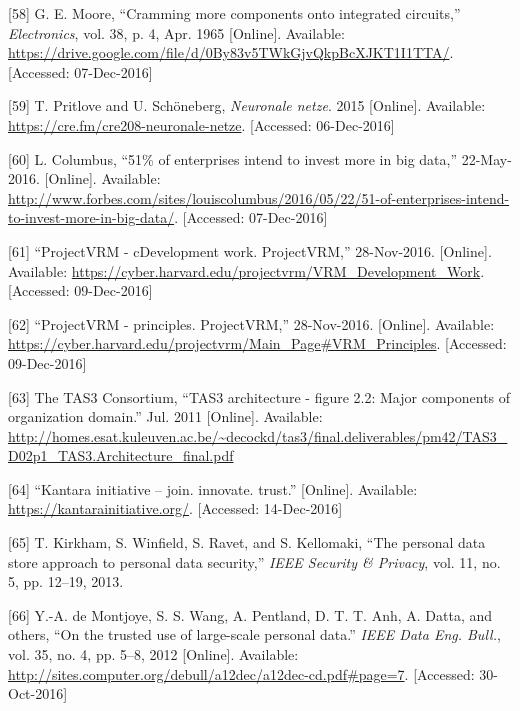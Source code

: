 \documentclass[12pt,english,a4paper,titlepage,cleardoublepage=empty,dottedtoc]{report}
\begin{document}
\hypertarget{ref-paper_1965_moors-law}{}
{[}58{]} G. E. Moore, ``Cramming more components onto integrated
circuits,'' \emph{Electronics}, vol. 38, p. 4, Apr. 1965 {[}Online{]}.
Available:
\url{https://drive.google.com/file/d/0By83v5TWkGjvQkpBcXJKT1I1TTA/}.
{[}Accessed: 07-Dec-2016{]}

\hypertarget{ref-podcast_2015_cre-neuronale-netze}{}
{[}59{]} T. Pritlove and U. Schöneberg, \emph{Neuronale netze}. 2015
{[}Online{]}. Available: \url{https://cre.fm/cre208-neuronale-netze}.
{[}Accessed: 06-Dec-2016{]}

\hypertarget{ref-web_2016_industries-intention-to-invest-in-big-data}{}
{[}60{]} L. Columbus, ``51\% of enterprises intend to invest more in big
data,'' 22-May-2016. {[}Online{]}. Available:
\url{http://www.forbes.com/sites/louiscolumbus/2016/05/22/51-of-enterprises-intend-to-invest-more-in-big-data/}.
{[}Accessed: 07-Dec-2016{]}

\hypertarget{ref-web_2016_projectvrm_development-work}{}
{[}61{]} ``ProjectVRM - cDevelopment work. ProjectVRM,'' 28-Nov-2016.
{[}Online{]}. Available:
\url{https://cyber.harvard.edu/projectvrm/VRM_Development_Work}.
{[}Accessed: 09-Dec-2016{]}

\hypertarget{ref-web_2016_projectvrm_principles}{}
{[}62{]} ``ProjectVRM - principles. ProjectVRM,'' 28-Nov-2016.
{[}Online{]}. Available:
\url{https://cyber.harvard.edu/projectvrm/Main_Page\#VRM_Principles}.
{[}Accessed: 09-Dec-2016{]}

\hypertarget{ref-graphic_2011_architecture_components-of-organization-domain}{}
{[}63{]} The TAS3 Consortium, ``TAS3 architecture - figure 2.2: Major
components of organization domain.'' Jul. 2011 {[}Online{]}. Available:
\url{http://homes.esat.kuleuven.ac.be/~decockd/tas3/final.deliverables/pm42/TAS3_D02p1_TAS3.Architecture_final.pdf}

\hypertarget{ref-web_kantara-initiative}{}
{[}64{]} ``Kantara initiative -- join. innovate. trust.'' {[}Online{]}.
Available: \url{https://kantarainitiative.org/}. {[}Accessed:
14-Dec-2016{]}

\hypertarget{ref-paper_2014_personal-data-store-approach}{}
{[}65{]} T. Kirkham, S. Winfield, S. Ravet, and S. Kellomaki, ``The
personal data store approach to personal data security,'' \emph{IEEE
Security \& Privacy}, vol. 11, no. 5, pp. 12--19, 2013.

\hypertarget{ref-paper_2012_openpds_on-trusted-use-of-large-scale-personal-data}{}
{[}66{]} Y.-A. de Montjoye, S. S. Wang, A. Pentland, D. T. T. Anh, A.
Datta, and others, ``On the trusted use of large-scale personal data.''
\emph{IEEE Data Eng. Bull.}, vol. 35, no. 4, pp. 5--8, 2012
{[}Online{]}. Available:
\url{http://sites.computer.org/debull/a12dec/a12dec-cd.pdf\#page=7}.
{[}Accessed: 30-Oct-2016{]}
\end{document}

